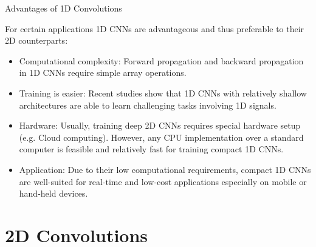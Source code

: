 \begin{vbframe}{Advantages of 1D Convolutions}

For certain applications 1D CNNs are advantageous and thus preferable to their 2D counterparts:

   \begin{itemize}
     \item Computational complexity: Forward propagation and backward propagation in 1D CNNs require simple array operations. 
     \item Training is easier: Recent studies show that 1D CNNs with relatively shallow architectures are able to learn challenging tasks involving 1D signals.
     \item Hardware: Usually, training deep 2D CNNs requires special hardware setup (e.g. Cloud computing). However, any CPU implementation over a standard computer is feasible and relatively fast for training compact 1D CNNs.
     \item Application: Due to their low computational requirements, compact 1D CNNs are well-suited for real-time and low-cost applications especially on mobile or hand-held devices.

     \end{itemize}



\end{vbframe}

\section{2D Convolutions}

